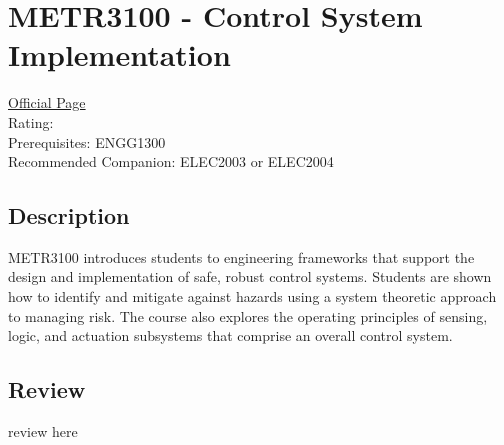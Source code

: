 \hypertarget{METR3100}{\section{METR3100 - Control System Implementation}}

\large
\textcolor{turbo_purple}{\href{https://my.uq.edu.au/programs-courses/course.html?course_code=METR3100}{Official Page}} \\
Rating: \cstar\cstar\cstar\cstar\ostar \\
Prerequisites: ENGG1300 \\
Recommended Companion: ELEC2003 or ELEC2004

\normalsize
\subsection*{Description}
METR3100 introduces students to engineering frameworks that support the design and implementation of safe, robust control systems.
Students are shown how to identify and mitigate against hazards using a system theoretic approach to managing risk.
The course also explores the operating principles of sensing, logic, and actuation subsystems that comprise an overall control system.

\subsection*{Review}
review here
